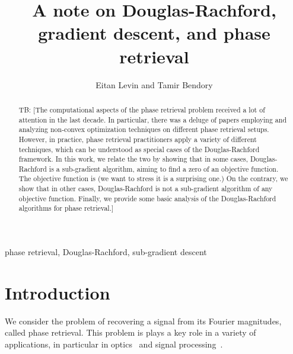 \documentclass[journal]{IEEEtran}
\theoremstyle{definition}
\theoremstyle{remark}
\theoremstyle{definition}
\theoremstyle{problem}
\theoremstyle{definition}
\newcommand{\TODO}[1]{{\color{red}{[#1]}}}
\newcommand{\tb}[1]{{\color{blue}TB: {[#1]}}}
\begin{document}

\title{A note on Douglas-Rachford, gradient descent, and phase retrieval}

\author{Eitan Levin and Tamir Bendory}
\maketitle

\begin{abstract}
\tb{The computational aspects of the phase retrieval problem received a lot of attention in the last decade. In particular, there was a deluge of papers employing and analyzing non-convex optimization techniques on different phase retrieval setups. However, in practice, phase retrieval practitioners apply a variety of different techniques, which can be understood as special cases of the Douglas-Rachford framework. In this work, we relate the two by showing that in some cases, Douglas-Rachford is a sub-gradient algorithm, aiming to find a zero of an objective function.
The objective function is (we want to stress it is a surprising one.)	
On the contrary, we show that in other cases,  Douglas-Rachford is not a sub-gradient algorithm of any objective function. Finally, we provide some basic analysis of the Douglas-Rachford algorithms for phase retrieval.}
\end{abstract}

\begin{IEEEkeywords}
phase retrieval, Douglas-Rachford, sub-gradient descent 	
\end{IEEEkeywords}
	
\section{Introduction}

We consider the problem of recovering a signal from its Fourier magnitudes, called phase retrieval. 
This problem is plays a key role in a variety of applications, in particular in optics~\cite{walther1963question,shechtman2015phase,trebino2012frequency,fienup1987phase} and signal processing~\cite{Bendory2017,baykal2004blind,lawrence2008fundamentals,bendory2017bispectrum}. \TODO{We should re-write this paragraph. One possibility is to start by describing crystallography, and then say that phase retrieval has some other applications.}
\end{document}

